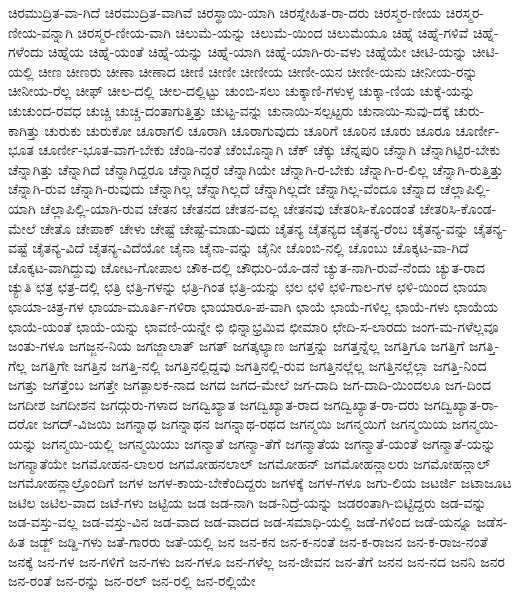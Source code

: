 {ಚಿರಮುದ್ರಿತ-ವಾ-ಗಿದೆ
ಚಿರಮುದ್ರಿತ-ವಾಗಿವೆ
ಚಿರಸ್ಥಾಯಿ-ಯಾಗಿ
ಚಿರಸ್ನೇಹಿತ-ರಾ-ದರು
ಚಿರಸ್ಮರ-ಣೀಯ
ಚಿರಸ್ಮರ-ಣೀಯ-ವನ್ನಾಗಿ
ಚಿರಸ್ಮರ-ಣೀಯ-ವಾಗಿ
ಚಿಲುಮೆ-ಯನ್ನು
ಚಿಲುಮೆ-ಯಿಂದ
ಚಿಲುಮೆಯೂ
ಚಿಹ್ನೆ
ಚಿಹ್ನೆ-ಗಳಿವೆ
ಚಿಹ್ನೆ-ಗಳೆಂದು
ಚಿಹ್ನೆಯ
ಚಿಹ್ನೆ-ಯಂತೆ
ಚಿಹ್ನೆ-ಯನ್ನು
ಚಿಹ್ನೆ-ಯಾಗಿ
ಚಿಹ್ನೆ-ಯಾಗಿ-ರು-ವಳು
ಚಿಹ್ನೆಯೇ
ಚೀಟಿ-ಯನ್ನು
ಚೀಟಿ-ಯಲ್ಲಿ
ಚೀಣ
ಚೀಣರು
ಚೀಣಾ
ಚೀಣಾದ
ಚೀಣಿ
ಚೀಣೀ
ಚೀಣೀಯ
ಚೀಣೀ-ಯನ
ಚೀಣೀ-ಯನು
ಚೀನೀಯ-ರನ್ನು
ಚೀನೀಯ-ರೆಲ್ಲ
ಚೀಫ್
ಚೀಲ-ದಲ್ಲಿ
ಚೀಲ-ದಲ್ಲಿಟ್ಟು
ಚುಂಬಿ-ಸಲು
ಚುಕ್ಕಾಣಿ-ಗಳುಳ್ಳ
ಚುಕ್ಕಾ-ಣಿಯ
ಚುಕ್ಕೆ-ಯನ್ನು
ಚುಚುಂದ-ರವಧ
ಚುಚ್ಚಿ
ಚುಚ್ಚಿ-ದಂತಾಗುತ್ತಿತ್ತು
ಚುಟ್ಟ-ವನ್ನು
ಚುನಾಯಿ-ಸಲ್ಪಟ್ಟರು
ಚುನಾಯಿ-ಸುವು-ದಕ್ಕೆ
ಚುರು-ಕಾಗಿತ್ತು
ಚುರುಕು
ಚುರುಕೋ
ಚೂರಾಗಲಿ
ಚೂರಾಗಿ
ಚೂರಾಗುವುದು
ಚೂರಿಗೆ
ಚೂರಿನ
ಚೂರು
ಚೂರೂ
ಚೂರ್ಣೀ-ಭೂತ
ಚೂರ್ಣೀ-ಭೂತ-ವಾಗ-ಬೇಕು
ಚೆಂಡಿ-ನಂತೆ
ಚೆಂಬೊನ್ನಾಗಿ
ಚೆಕ್
ಚೆಕ್ಕು
ಚೆನ್ನಪುರಿ
ಚೆನ್ನಾಗಿ
ಚೆನ್ನಾಗಿಟ್ಟಿರ-ಬೇಕು
ಚೆನ್ನಾಗಿತ್ತು
ಚೆನ್ನಾಗಿದೆ
ಚೆನ್ನಾಗಿದ್ದರೂ
ಚೆನ್ನಾಗಿದ್ದರೆ
ಚೆನ್ನಾಗಿಯೇ
ಚೆನ್ನಾಗಿ-ರ-ಬೇಕು
ಚೆನ್ನಾಗಿ-ರ-ಲಿಲ್ಲ
ಚೆನ್ನಾಗಿ-ರುತ್ತಿತ್ತು
ಚೆನ್ನಾಗಿ-ರುವ
ಚೆನ್ನಾಗಿ-ರುವುದು
ಚೆನ್ನಾಗಿಲ್ಲ
ಚೆನ್ನಾಗಿಲ್ಲದೆ
ಚೆನ್ನಾಗಿಲ್ಲದೇ
ಚೆನ್ನಾಗಿಲ್ಲ-ವೆಂದೂ
ಚೆನ್ನಾದ
ಚೆಲ್ಲಾಪಿಲ್ಲಿ-ಯಾಗಿ
ಚೆಲ್ಲಾಪಿಲ್ಲಿ-ಯಾಗಿ-ರುವ
ಚೇತನ
ಚೇತನದ
ಚೇತನ-ವಲ್ಲ
ಚೇತನವು
ಚೇತರಿಸಿ-ಕೊಂಡಂತೆ
ಚೇತರಿಸಿ-ಕೊಂಡ-ಮೇಲೆ
ಚೇತೊ
ಚೇಪಾಕ್
ಚೇಳು
ಚೇಷ್ಟೆ
ಚೇಷ್ಟೆ-ಮಾಡು-ವುದು
ಚೈತನ್ಯ
ಚೈತನ್ಯದ
ಚೈತನ್ಯ-ರೆಂಬ
ಚೈತನ್ಯ-ವನ್ನು
ಚೈತನ್ಯ-ವಷ್ಟೆ
ಚೈತನ್ಯ-ವಿದೆ
ಚೈತನ್ಯ-ವಿದೆಯೋ
ಚೈನಾ
ಚೈನಾ-ವನ್ನು
ಚೈನೀ
ಚೊಂಬಿ-ನಲ್ಲಿ
ಚೊಂಬು
ಚೊಕ್ಕಟ-ವಾ-ಗಿದೆ
ಚೊಕ್ಕಟ-ವಾಗಿದ್ದುವು
ಚೋಟ-ಗೋಪಾಲ
ಚೌಕ-ದಲ್ಲಿ
ಚೌಧುರಿ-ಯೊ-ಡನೆ
ಚ್ಯುತ-ನಾಗಿ-ರುವೆ-ನೆಂದು
ಚ್ಯುತ-ರಾದ
ಚ್ಯುತಿ
ಛತ್ರ
ಛತ್ರ-ದಲ್ಲಿ
ಛತ್ರಿ
ಛತ್ರಿ-ಗಳನ್ನು
ಛತ್ರಿ-ಗಿಂತ
ಛತ್ರಿ-ಯನ್ನು
ಛಲ
ಛಳಿ
ಛಳಿ-ಗಾಲ-ಗಳ
ಛಳಿ-ಯಿಂದ
ಛಾಯಾ
ಛಾಯಾ-ಚಿತ್ರ-ಗಳ
ಛಾಯಾ-ಮೂರ್ತಿ-ಗಳಿರಾ
ಛಾಯಾರೂ-ಪ-ವಾಗಿ
ಛಾಯೆ
ಛಾಯೆ-ಗಳಿಲ್ಲ
ಛಾಯೆ-ಗಳು
ಛಾಯೆಯ
ಛಾಯೆ-ಯಂತೆ
ಛಾಯೆ-ಯನ್ನು
ಛಾವಣಿ-ಯನ್ನೇ
ಛಿ
ಛಿನ್ನಾಭ್ರಮಿವ
ಛೀಮಾರಿ
ಛೇದಿ-ಸ-ಲಾರದು
ಜಂಗ-ಮ-ಗಳೆಲ್ಲವೂ
ಜಂತು-ಗಳೂ
ಜಗಜ್ಜನ-ನಿಯ
ಜಗಜ್ಜಾಲಾತ್
ಜಗತ್
ಜಗತ್ಕಲ್ಯಾಣ
ಜಗತ್ತನ್ನು
ಜಗತ್ತನ್ನೆಲ್ಲ
ಜಗತ್ತಿಗೂ
ಜಗತ್ತಿಗೆ
ಜಗತ್ತಿ-ಗೆಲ್ಲ
ಜಗತ್ತಿಗೇ
ಜಗತ್ತಿನ
ಜಗತ್ತಿ-ನಲ್ಲಿ
ಜಗತ್ತಿನಲ್ಲಿದ್ದವು
ಜಗತ್ತಿನಲ್ಲಿ-ರುವ
ಜಗತ್ತಿನಲ್ಲೆಲ್ಲ
ಜಗತ್ತಿನಲ್ಲೆಲ್ಲಾ
ಜಗತ್ತಿ-ನಿಂದ
ಜಗತ್ತು
ಜಗತ್ತೆಂಬ
ಜಗತ್ತೇ
ಜಗತ್ಪಾಲಕ-ನಾದ
ಜಗದ
ಜಗದ-ಮೇಲೆ
ಜಗ-ದಾದಿ
ಜಗ-ದಾದಿ-ಯಿಂದಲೂ
ಜಗ-ದಿಂದ
ಜಗದೀಶ
ಜಗದೀಶನ
ಜಗದ್ಗುರು-ಗಳಾದ
ಜಗದ್ವಿಖ್ಯಾತ
ಜಗದ್ವಿಖ್ಯಾತ-ರಾದ
ಜಗದ್ವಿಖ್ಯಾತ-ರಾ-ದರು
ಜಗದ್ವಿಖ್ಯಾತ-ರಾ-ದರೋ
ಜಗದ್-ವಿಜಯಿ
ಜಗನ್ನಾಥ
ಜಗನ್ನಾಥನ
ಜಗನ್ನಾಥ-ರಥದ
ಜಗನ್ಮಯಿ
ಜಗನ್ಮಯಿಗೆ
ಜಗನ್ಮಯಿಯ
ಜಗನ್ಮಯಿ-ಯನ್ನು
ಜಗನ್ಮಯಿ-ಯಲ್ಲಿ
ಜಗನ್ಮಯಿಯು
ಜಗನ್ಮಾತೆ
ಜಗನ್ಮಾ-ತೆಗೆ
ಜಗನ್ಮಾತೆಯ
ಜಗನ್ಮಾತೆ-ಯಂತೆ
ಜಗನ್ಮಾತೆ-ಯನ್ನು
ಜಗನ್ಮಾತೆಯೇ
ಜಗಮೋಹನ-ಲಾಲರ
ಜಗಮೋಹನಲಾಲ್
ಜಗಮೋಹನ್
ಜಗಮೋಹನ್ಲಾಲರು
ಜಗಮೋಹನ್ಲಾಲ್
ಜಗಮೋಹನ್ಲಾಲ್ರೊಂದಿಗೆ
ಜಗಳ
ಜಗಳ-ಕಾಯ-ಬೇಕೆಂದಿದ್ದರು
ಜಗಳಕ್ಕೆ
ಜಗಳ-ಗಳೂ
ಜಗು-ಲಿಯ
ಜಟರ್ಜಿ
ಜಟಾಜೂಟ
ಜಟಿಲ
ಜಟಿಲ-ವಾದ
ಜಟೆ-ಗಳು
ಜಟ್ಟಿಯ
ಜಡ
ಜಡ-ನಾಗಿ
ಜಡ-ನಿದ್ರೆ-ಯನ್ನು
ಜಡರಂತಾಗಿ-ಬಿಟ್ಟಿದ್ದರು
ಜಡ-ವನ್ನು
ಜಡ-ವಸ್ತು-ವಲ್ಲ
ಜಡ-ವಸ್ತು-ವಿನ
ಜಡ-ವಾದ
ಜಡ-ವಾದದ
ಜಡ-ಸಮಾಧಿ-ಯಲ್ಲಿ
ಜಡೆ-ಗಳಿಂದ
ಜಡೆ-ಯನ್ನೂ
ಜಡೆಸ-ಹಿತ
ಜಡ್ಜ್
ಜಡ್ಡಿ-ಗಳು
ಜತೆ-ಗಾರರು
ಜತೆ-ಯಲ್ಲಿ
ಜನ
ಜನ-ಕನ
ಜನ-ಕ-ನಂತೆ
ಜನ-ಕ-ರಾಜನ
ಜನ-ಕ-ರಾಜ-ನಂತೆ
ಜನಕ್ಕೆ
ಜನ-ಗಳ
ಜನ-ಗಳಿಗೆ
ಜನ-ಗಳು
ಜನ-ಗಳೂ
ಜನ-ಗಳೆಲ್ಲ
ಜನ-ಜೀವನ
ಜನ-ತೆಗೆ
ಜನನ
ಜನ-ನದ
ಜನನಿ
ಜನರ
ಜನ-ರಂತೆ
ಜನ-ರನ್ನು
ಜನ-ರಲ್
ಜನ-ರಲ್ಲಿ
ಜನ-ರಲ್ಲಿಯೇ
}
